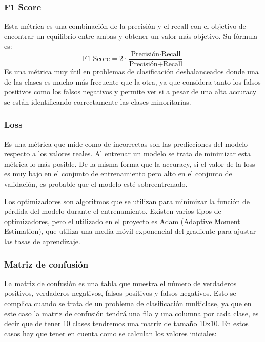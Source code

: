 \subsubsection{F1 Score}

Esta métrica es una combinación de la precisión y el recall con el objetivo de encontrar un equilibrio entre ambas y obtener un valor más objetivo.
Su fórmula es:
\begin{equation}
	\text{F1-Score} = 2 \cdot \frac{\text{Precisión} \cdot \text{Recall}}{\text{Precisión} + \text{Recall}}
\end{equation}
Es una métrica muy útil en problemas de clasificación desbalanceados donde una de las clases es mucho más frecuente que la otra, ya que considera tanto los falsos positivos como los falsos negativos y permite ver si a pesar de una alta accuracy se están identificando correctamente las clases minoritarias.

\subsubsection{Loss}

Es una métrica que mide como de incorrectas son las predicciones del modelo respecto a los valores reales. \cite{google:linear-regression}
Al entrenar un modelo se trata de minimizar esta métrica lo más posible. 
De la misma forma que la accuracy, si el valor de la loss es muy bajo en el conjunto de entrenamiento pero alto en el conjunto de validación, es probable que el modelo esté sobreentrenado.

Los optimizadores son algoritmos que se utilizan para minimizar la función de pérdida del modelo durante el entrenamiento.
Existen varios tipos de optimizadores, pero el utilizado en el proyecto es Adam (Adaptive Moment Estimation), que utiliza una media móvil exponencial del gradiente para ajustar las tasas de aprendizaje.

\subsubsection{Matriz de confusión}

La matriz de confusión es una tabla que muestra el número de verdaderos positivos, verdaderos negativos, falsos positivos y falsos negativos.
Esto se complica cuando se trata de un problema de clasificación multiclase\cite{medium:multiclass-classification}, ya que en este caso la matriz de confusión tendrá una fila y una columna por cada clase, es decir que de tener 10 clases tendremos una matriz de tamaño 10x10.
En estos casos hay que tener en cuenta como se calculan los valores iniciales:

